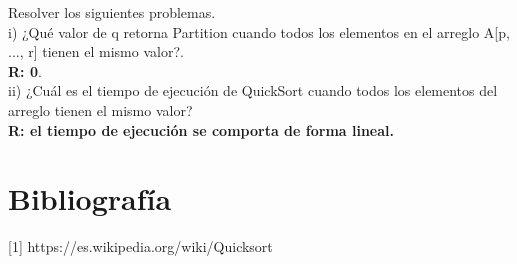 \documentclass[12pt]{report}
\begin{document}
Resolver los siguientes problemas.\\

i) ¿Qué valor de q retorna Partition cuando todos los elementos en el arreglo A[p, ..., r] tienen el mismo valor?.\\

\textbf{R: 0}.\\

ii) ¿Cuál es el tiempo de ejecución de QuickSort cuando todos los elementos del arreglo tienen el mismo valor?\\

\textbf{R: el tiempo de ejecución se comporta de forma lineal.}

\section{Bibliografía}

[1] https://es.wikipedia.org/wiki/Quicksort\\
	
\end{document}
